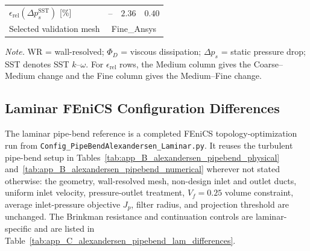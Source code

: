 \begin{table}[htbp]
\begin{tabular*}{\textwidth}{@{\extracolsep{\fill}}lccc@{}}
		$\epsilon_{\mathrm{rel}}(\Delta p_s^{\mathrm{SST}})$ [\%] & -- & $2.36$ & $0.40$ \\
		Selected validation mesh & \multicolumn{3}{c}{Fine\_Ansys} \\
		\hline
	\end{tabular*}
	\vspace{2pt}
	\begin{minipage}{0.98\textwidth}
		\scriptsize \textit{Note.} WR = wall-resolved; $\Phi_D$ = viscous dissipation; $\Delta p_s$ = static pressure drop; SST denotes SST $k$--$\omega$. For $\epsilon_{\mathrm{rel}}$ rows, the Medium column gives the Coarse--Medium change and the Fine column gives the Medium--Fine change.
	\end{minipage}
\end{table}

\FloatBarrier

\subsection{Laminar FEniCS Configuration Differences}
\label{subsec:app_C_alexandersen_pipebend_lam_config}
	The laminar pipe-bend reference is a completed FEniCS topology-optimization run from \texttt{Config\_PipeBendAlexandersen\_Laminar.py}. It reuses the turbulent pipe-bend setup in Tables~\ref{tab:app_B_alexandersen_pipebend_physical} and~\ref{tab:app_B_alexandersen_pipebend_numerical} wherever not stated otherwise: the geometry, wall-resolved mesh, non-design inlet and outlet ducts, uniform inlet velocity, pressure-outlet treatment, $V_f=0.25$ volume constraint, average inlet-pressure objective $J_p$, filter radius, and projection threshold are unchanged. The Brinkman resistance and continuation controls are laminar-specific and are listed in Table~\ref{tab:app_C_alexandersen_pipebend_lam_differences}.

